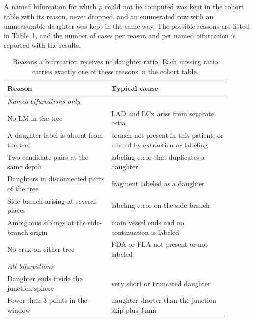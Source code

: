 A named bifurcation for which $\rho$ could not be computed was kept in the cohort table with its reason, never dropped, and an enumerated row with an unmeasurable daughter was kept in the same way.
The possible reasons are listed in Table~\ref{tab:daughter-ratio-missing}, and the number of cases per reason and per named bifurcation is reported with the results.

\begin{table}[htbp]
  \centering
  \caption{Reasons a bifurcation receives no daughter ratio. Each missing ratio carries exactly one of these reasons in the cohort table.}
  \label{tab:daughter-ratio-missing}
  \begin{tabular}{p{0.42\linewidth}p{0.48\linewidth}}
    \toprule
    Reason & Typical cause \\
    \midrule
    \multicolumn{2}{l}{\emph{Named bifurcations only}} \\
    No LM in the tree & LAD and LCx arise from separate ostia \\
    A daughter label is absent from the tree & branch not present in this patient, or missed by extraction or labeling \\
    Two candidate pairs at the same depth & labeling error that duplicates a daughter \\
    Daughters in disconnected parts of the tree & fragment labeled as a daughter \\
    Side branch arising at several places & labeling error on the side branch \\
    Ambiguous siblings at the side-branch origin & main vessel ends and no continuation is labeled \\
    No crux on either tree & PDA or PLA not present or not labeled \\
    \midrule
    \multicolumn{2}{l}{\emph{All bifurcations}} \\
    Daughter ends inside the junction sphere & very short or truncated daughter \\
    Fewer than 3 points in the window & daughter shorter than the junction skip plus 3\,mm \\
    \bottomrule
  \end{tabular}
\end{table}
